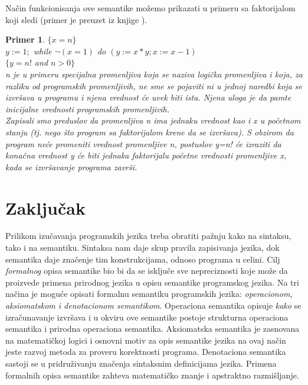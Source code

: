 \documentclass[a4paper]{article}
\newtheorem{primer}{Primer}[section]
\begin{document}
Način funkcionisanja ove semantike možemo prikazati u primeru sa faktorijalom koji sledi (primer je preuzet iz knjige \cite{nielson} ). \\
\begin{primer}
$\{ x=n \} $ \\
$  y := 1; $
 while $ \neg(x=1) $  do $ (y := x*y; x := x-1) $\\
$ \{ y=n!$ and $ n > 0 \} $ \\

n je u primeru specijalna promenljiva koja se naziva logička promenljiva i koja, za razliku od programskih promenljivih, ne sme se pojaviti ni u jednoj naredbi koja se izvršava u programu i njena vrednost će uvek biti ista. Njena uloga je da pamte inicijalne vrednosti programskih promenljivih. \\
 Zapisali smo  preduslov da promenljiva n ima jednaku vrednost kao i x u početnom stanju (tj. nego što program sa faktorijalom krene da se izvršava). S obzirom da program neće promeniti vrednost promenljive n, postuslov y=n! će izraziti da konačna vrednost y  će biti jednaka faktorijalu početne vrednosti promenljive x, kada se izvršavanje programa završi. \\

\end{primer}

\section{Zaključak}
\label{sec:zakljucak}

Prilikom izučavanja programskih jezika treba obratiti pažnju kako na sintaksu, tako i na semantiku. Sintaksa nam daje skup pravila zapisivanja jezika, dok semantika daje značenje tim konstrukcijama, odnoso programa u celini. Cilj \textit{formalnog} opisa semantike bio bi da se isključe sve nepreciznosti koje može da proizvede primena prirodnog jezika u opisu semantike programskog jezika. Na tri načina je moguće opisati formalnu semantiku programskih jezika: \textit{operacionom, aksiomatskom  i  denotacionom semantikom}. Operaciona semantika opisuje \textit{kako} se izračunavanje izvršava i u okviru ove semantike postoje strukturna operaciona semantika i prirodna operaciona semantika. Aksiomatska semantika je zasnovana na matematičkoj logici i osnovni motiv za opis semantike jezika na ovaj način jeste razvoj metoda za proveru korektnosti programa. Denotaciona semantika sastoji se u pridruživanju značenja sintaksnim definicijama jezika. Primena formalnih opisa semantike zahteva matematičko znanje i apstraktno razmišljanje.


\appendix



\appendix
\end{document}
